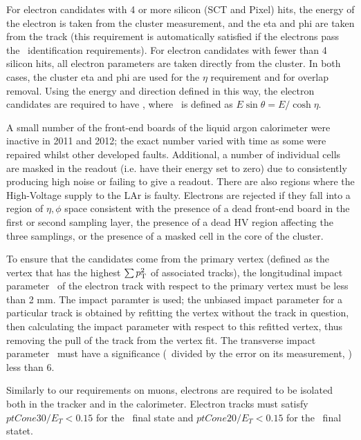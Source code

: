 For electron candidates with 4 or more silicon (SCT and Pixel) hits, the energy of
the electron is taken from the cluster measurement, and the eta and phi
are taken from the track (this requirement is automatically satisfied if the
electrons pass the \loosePP\ identification requirements). For electron candidates with fewer than 4
silicon hits, all electron parameters are taken directly from the
cluster. In both cases, the cluster eta and phi are used for the $\eta$
requirement and for overlap removal. Using the energy and direction defined in this way, the electron
candidates are required to have , where \et\ is defined as
$E\sin{\theta}=E/\cosh{\eta}$. 

A small number of the front-end boards of the liquid argon calorimeter were
inactive in 2011 and 2012; the exact number varied with time as some were
repaired whilst other developed faults. Additional, a number of individual cells
are masked in the readout (i.e. have their energy set to zero) due to
consistently producing high noise or failing to give a readout. There are also
regions where the High-Voltage supply to the LAr is faulty. Electrons are
rejected if they fall into a region of
$\eta, \phi$ space consistent with the presence of a dead front-end board in
the first or second sampling layer, the presence of a dead HV region affecting the
three samplings, or the presence of a masked cell in the core of the cluster.

To ensure that the candidates come from the primary vertex (defined as the
vertex that has the highest $\sum{\ensuremath{p_{\mathrm{T}}}^2}$ of associated tracks), the
longitudinal impact parameter \zzero\ of the electron track with respect to the
primary vertex must be less than 2 mm. The  impact paramter is
used; the unbiased impact parameter for a particular track is obtained by
refitting the vertex without the track in question, then calculating the impact
parameter with respect to this refitted vertex, thus removing the pull of the
track from the vertex fit.  The transverse impact parameter \dzero\ must have a
significance (\dzero\ divided by the error on its measurement, \dzerosig) less
than 6.


Similarly to our requirements on muons, electrons are required to be isolated both in the tracker and in the calorimeter.
Electron tracks must satisfy $ptCone30/E_{T}<0.15$ for the \llvv\ final state
and $ptCone20/E_{T}<0.15$ for the \llll\ final statet. 

